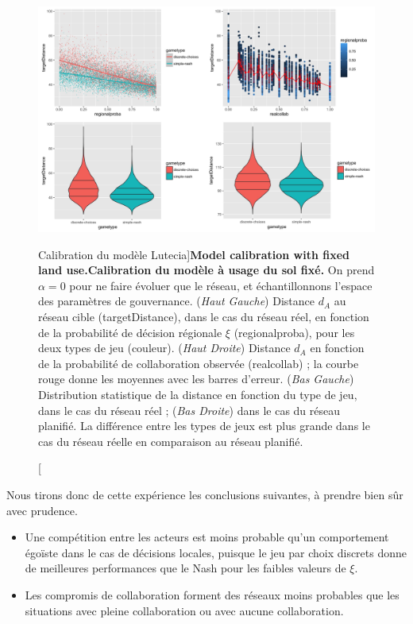 \begin{figure}
	\includegraphics[width=\linewidth]{Figures/Final/7-3-3-fig-lutecia-calib.jpg}
	\caption[Calibration of the Lutecia model][Calibration du modèle Lutecia]{\textbf{Model calibration with fixed land use.}\label{fig:lutecia:calib}}{\textbf{Calibration du modèle à usage du sol fixé.} On prend $\alpha = 0$ pour ne faire évoluer que le réseau, et échantillonnons l'espace des paramètres de gouvernance. (\textit{Haut Gauche}) Distance $d_A$ au réseau cible (targetDistance), dans le cas du réseau réel, en fonction de la probabilité de décision régionale $\xi$ (regionalproba), pour les deux types de jeu (couleur). (\textit{Haut Droite}) Distance $d_A$ en fonction de la probabilité de collaboration observée (realcollab) ; la courbe rouge donne les moyennes avec les barres d'erreur. (\textit{Bas Gauche}) Distribution statistique de la distance en fonction du type de jeu, dans le cas du réseau réel ; (\textit{Bas Droite}) dans le cas du réseau planifié. La différence entre les types de jeux est plus grande dans le cas du réseau réelle en comparaison au réseau planifié.\label{fig:lutecia:calib}}
\end{figure}



Nous tirons donc de cette expérience les conclusions suivantes, à prendre bien sûr avec prudence.
\begin{itemize}
	\item Une compétition entre les acteurs est moins probable qu'un comportement égoïste dans le cas de décisions locales, puisque le jeu par choix discrets donne de meilleures performances que le Nash pour les faibles valeurs de $\xi$.
	\item Les compromis de collaboration forment des réseaux moins probables que les situations avec pleine collaboration ou avec aucune collaboration.
\end{itemize}


